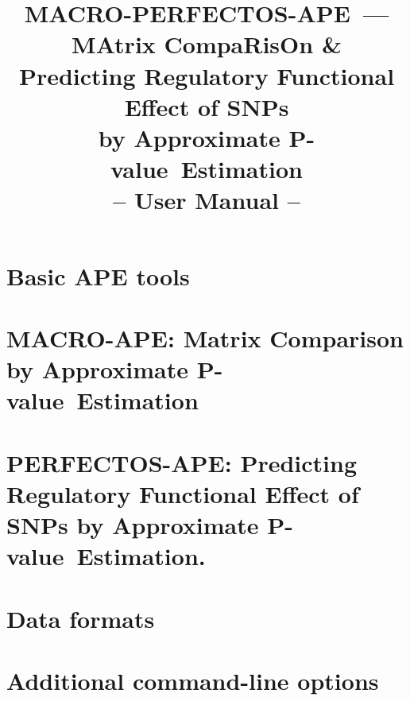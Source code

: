 \documentclass[draft]{article}
\newcommand*{\pvalue}{\mbox{P-value}}
\begin{document}
\title{
MACRO-PERFECTOS-APE~---\\{\small MAtrix CompaRisOn \&\\ Predicting Regulatory Functional Effect of SNPs\\ by Approximate \pvalue\ Estimation}\\
-- User Manual --
}
\maketitle








\section{Basic APE tools}







\section{MACRO-APE: Matrix Comparison by Approximate \pvalue\ Estimation}






\section{PERFECTOS-APE: Predicting Regulatory Functional Effect of SNPs by Approximate \pvalue\ Estimation.}





\section{Data formats}




\section{Additional command-line options}


\end{document}
